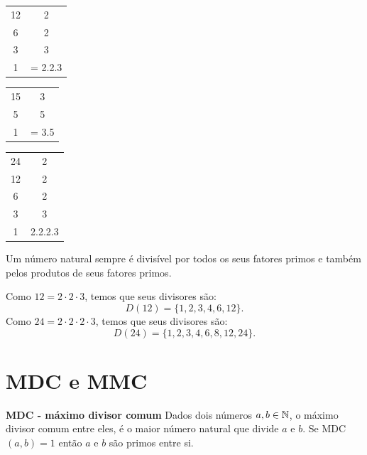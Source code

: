  \begin{multicols}{3}
   \begin{tabular}{c|c}
  12 & 2 \\
   6 & 2 \\
   3 & 3 \\
   1 & = 2.2.3 \\
 \end{tabular}

 \begin{tabular}{c|c}
  15 & 3 \\
   5 & 5 \\
   1 & = 3.5 \\
 \end{tabular}

 \begin{tabular}{c|c}
  24 & 2 \\
  12 & 2 \\
   6 & 2 \\
   3 & 3 \\
   1 & 2.2.2.3 \\
 \end{tabular}
 \end{multicols}

 \begin{obs}
 Um número natural sempre é divisível por todos os seus fatores primos e também pelos produtos de seus fatores primos.
 \end{obs}

 \begin{exem}
 Como $12= 2 \cdot 2 \cdot 3$, temos que seus divisores são:\begin{equation}
D(12)= \{1, 2, 3, 4, 6, 12\}.
\end{equation}
 Como $24= 2 \cdot 2 \cdot 2 \cdot 3$, temos que seus divisores são:\begin{equation}
D(24)= \{1, 2, 3, 4, 6, 8, 12, 24\}.
\end{equation}
 \end{exem}

 \section{MDC e MMC}

 \vskip0.3cm
 \colorbox{azul}{
 \begin{minipage}{0.9\linewidth}
 \begin{center}
  \textbf{MDC - máximo divisor comum}
  Dados dois números $a, b \in \mathbb{N}$, o máximo divisor comum entre eles, é o maior número natural que divide $a$ e $b$. Se MDC$(a, b)= 1$ então $a$ e $b$ são primos entre si.
 \end{center}
 \end{minipage}}

